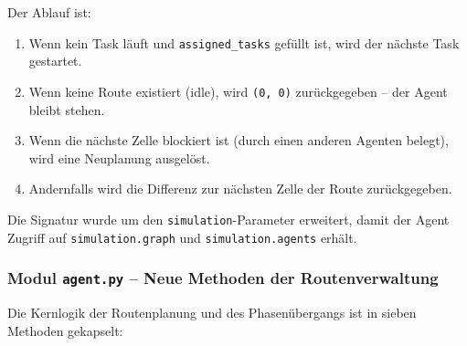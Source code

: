 

Der Ablauf ist:
\begin{enumerate}
    \item Wenn kein Task läuft und \texttt{assigned\_tasks} gefüllt ist, wird der nächste Task gestartet.
    \item Wenn keine Route existiert (idle), wird \texttt{(0, 0)} zurückgegeben -- der Agent bleibt stehen.
    \item Wenn die nächste Zelle blockiert ist (durch einen anderen Agenten belegt), wird eine Neuplanung ausgelöst.
    \item Andernfalls wird die Differenz zur nächsten Zelle der Route zurückgegeben.
\end{enumerate}

Die Signatur wurde um den \texttt{simulation}-Parameter erweitert, damit der Agent Zugriff auf \texttt{simulation.graph} und \texttt{simulation.agents} erhält.


\subsubsection{Modul \texttt{agent.py} – Neue Methoden der Routenverwaltung}

Die Kernlogik der Routenplanung und des Phasenübergangs ist in sieben Methoden gekapselt:



